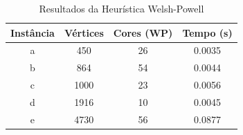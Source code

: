 \begin{table}
\centering
\caption{Resultados da Heurística Welsh-Powell}
\label{tab:resultados_welsh_powell_1}
\begin{tabular}{cccc}
\toprule
Instância & Vértices & Cores (WP) & Tempo (s) \\
\midrule
a & 450 & 26 & 0.0035 \\
b & 864 & 54 & 0.0044 \\
c & 1000 & 23 & 0.0056 \\
d & 1916 & 10 & 0.0045 \\
e & 4730 & 56 & 0.0877 \\
\bottomrule
\end{tabular}
\end{table}
